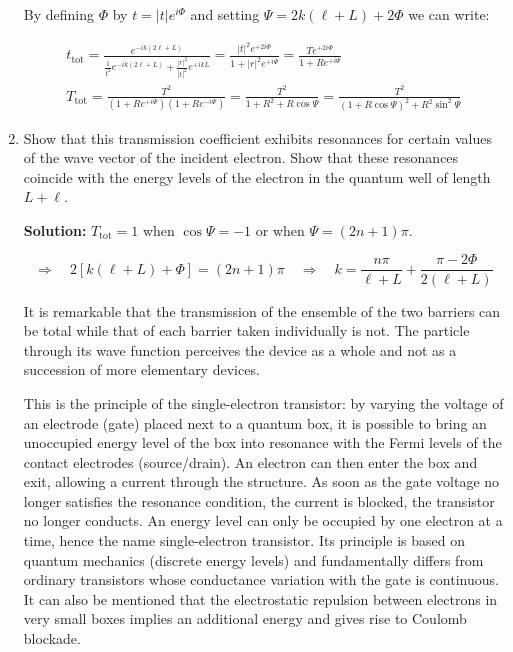 \documentclass{article}
\begin{document}
\begin{enumerate}
{    By defining $\Phi$ by $t = |t| e^{i \Phi}$ and setting $\Psi = 2 k(\ell+L) + 2 \Phi$ we can write:

    $$
    \begin{gathered}
    t_{\text{tot}} = \frac{e^{-i k(2 \ell+L)}}{\frac{1}{t^{2}} e^{-i k(2 \ell+L)} + \frac{|r|^{2}}{|t|^{2}} e^{+i k L}} = \frac{|t|^{2} e^{+2 i \Phi}}{1 + |r|^{2} e^{+i \Psi}} = \frac{T e^{+2 i \Phi}}{1 + R e^{+i \Psi}} \\
    T_{\text{tot}} = \frac{T^{2}}{\left(1 + R e^{+i \Psi}\right)\left(1 + R e^{-i \Psi}\right)} = \frac{T^{2}}{1 + R^{2} + R \cos \Psi} = \frac{T^{2}}{\left(1 + R \cos \Psi\right)^{2} + R^{2} \sin ^{2} \Psi}
    \end{gathered}
    $$}


    \item Show that this transmission coefficient exhibits resonances for certain values of the wave vector of the incident electron. Show that these resonances coincide with the energy levels of the electron in the quantum well of length $L+\ell$.

    {\color{red}\textbf{Solution:} $T_{\text{tot}} = 1$ when $\cos \Psi = -1$ or when $\Psi = (2n+1)\pi$.

    $$
    \Rightarrow \quad 2[k(\ell+L) + \Phi] = (2n+1)\pi \quad \Rightarrow \quad k = \frac{n \pi}{\ell+L} + \frac{\pi - 2 \Phi}{2(\ell+L)}
    $$

    It is remarkable that the transmission of the ensemble of the two barriers can be total while that of each barrier taken individually is not. The particle through its wave function perceives the device as a whole and not as a succession of more elementary devices.

    This is the principle of the single-electron transistor: by varying the voltage of an electrode (gate) placed next to a quantum box, it is possible to bring an unoccupied energy level of the box into resonance with the Fermi levels of the contact electrodes (source/drain). An electron can then enter the box and exit, allowing a current through the structure. As soon as the gate voltage no longer satisfies the resonance condition, the current is blocked, the transistor no longer conducts. An energy level can only be occupied by one electron at a time, hence the name single-electron transistor. Its principle is based on quantum mechanics (discrete energy levels) and fundamentally differs from ordinary transistors whose conductance variation with the gate is continuous. It can also be mentioned that the electrostatic repulsion between electrons in very small boxes implies an additional energy and gives rise to Coulomb blockade.}
    
    
    \end{enumerate}
\end{document}

